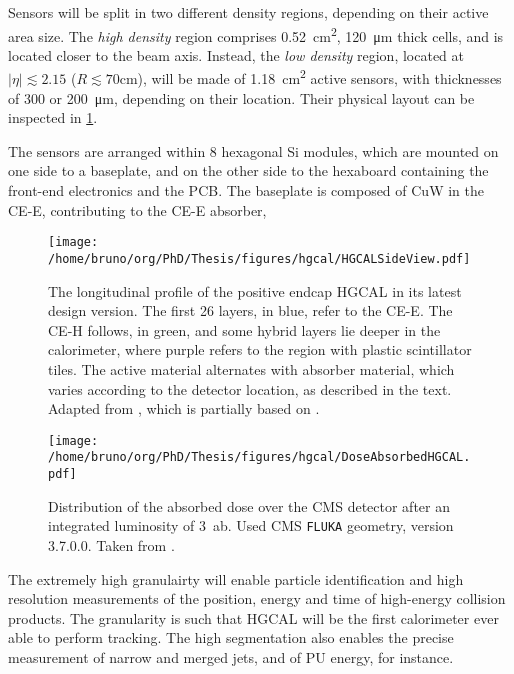 \documentclass[11pt]{article}
\begin{document}
Sensors will be split in two different density regions, depending on their active area size.
The \emph{high density} region comprises \SI{0.52}{\centi\meter\squared}, \SI{120}{\micro\meter} thick cells, and is located closer to the beam axis.
Instead, the \emph{low density} region, located at \(|\eta| \lesssim 2.15\) (\(R \lesssim 70\si{\centi\meter}\)), will be made of \SI{1.18}{\centi\meter\squared} active sensors, with thicknesses of \num{300} or \SI{200}{\micro\meter}, depending on their location.
Their physical layout can be inspected in \cref{fig:hgcal_side_view}.

The sensors are arranged within \SI{8}{\inch} hexagonal \ac{Si} modules, which are mounted on one side to a baseplate, and on the other side to the hexaboard containing the front-end electronics and the \ac{PCB}. The baseplate is composed of CuW in the \ac{CE-E}, contributing to the \ac{CE-E} absorber,

\begin{figure}
\begin{center}
\texttt{[image: /home/bruno/org/PhD/Thesis/figures/hgcal/HGCALSideView.pdf]}
\end{center}
\caption{\label{fig:hgcal_side_view}The longitudinal profile of the positive endcap \ac{HGCAL} in its latest design version. The first \num{26} layers, in blue, refer to the \ac{CE-E}. The \ac{CE-H} follows, in green, and some hybrid layers lie deeper in the calorimeter, where purple refers to the region with plastic scintillator tiles. The active material alternates with absorber material, which varies according to the detector location, as described in the text. Adapted from \cite{hgcal_web}, which is partially based on \cite{hgcalTDR}.}
\end{figure}

\begin{figure}
\begin{center}
\texttt{[image: /home/bruno/org/PhD/Thesis/figures/hgcal/DoseAbsorbedHGCAL.pdf]}
\end{center}
\caption{\label{fig:dose_abosrbed_hgcal}Distribution of the absorbed dose over the \ac{CMS} detector after an integrated luminosity of \SI{3}{\atto\barn}. Used \ac{CMS} \texttt{FLUKA} geometry, version 3.7.0.0. Taken from \cite{hgcalTDR}.}
\end{figure}


The extremely high granulairty will enable particle identification and high resolution measurements of the position, energy and time of high-energy collision products.
The granularity is such that \ac{HGCAL} will be the first calorimeter ever able to perform tracking.
The high segmentation also enables the precise measurement of narrow and merged jets, and of \ac{PU} energy, for instance.
\end{document}
